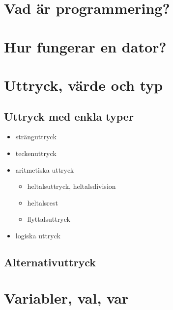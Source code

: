 


\section{Vad är programmering?}
\lipsum[1]

\section{Hur fungerar en dator?}
\lipsum[2]

\section{Uttryck, värde och typ}

\subsection{Uttryck med enkla typer}

\begin{itemize}
\item stränguttryck
\item teckenuttryck
\item aritmetiska uttryck
\begin{itemize}
\item heltalsuttryck, heltalsdivision
\item heltalsrest
\item flyttalsuttryck
\end{itemize}
\item logiska uttryck


\end{itemize}

\subsection{Alternativuttryck}

\section{Variabler, val, var}







